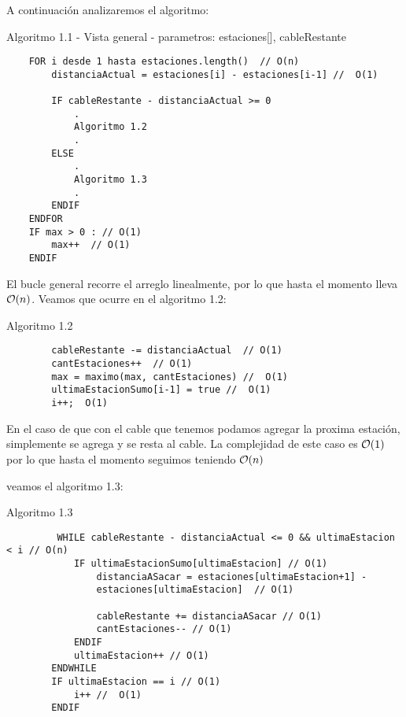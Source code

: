 A continuaci\'on analizaremos el algoritmo:
\begin{description}
    Algoritmo 1.1 - Vista general - parametros: estaciones[], cableRestante
    \begin{verbatim}
    FOR i desde 1 hasta estaciones.length()  // O(n)
        distanciaActual = estaciones[i] - estaciones[i-1] //  O(1)
    
        IF cableRestante - distanciaActual >= 0
            .
            Algoritmo 1.2
            .
        ELSE
            .
            Algoritmo 1.3
            .
        ENDIF
    ENDFOR
    IF max > 0 : // O(1)
        max++  // O(1)
    ENDIF
    \end{verbatim}
\end{description}    
    
El bucle general recorre el arreglo linealmente, por lo que hasta el momento lleva $\mathcal{O}(n)$.
Veamos que ocurre en el algoritmo 1.2:

\begin{description}
    Algoritmo 1.2
    \begin{verbatim}
        cableRestante -= distanciaActual  // O(1)
        cantEstaciones++  // O(1)
        max = maximo(max, cantEstaciones) //  O(1)
        ultimaEstacionSumo[i-1] = true //  O(1)
        i++;  O(1)
    \end{verbatim}
\end{description}

En el caso de que con el cable que tenemos podamos agregar la proxima estaci\'on, simplemente se agrega y se resta al cable.
La complejidad de este caso es $\mathcal{O}(1)$ por lo que hasta el momento seguimos teniendo $\mathcal{O}(n)$

veamos el algoritmo 1.3:
\begin{description}
    Algoritmo 1.3
    \begin{verbatim}
         WHILE cableRestante - distanciaActual <= 0 && ultimaEstacion < i // O(n)
            IF ultimaEstacionSumo[ultimaEstacion] // O(1)
                distanciaASacar = estaciones[ultimaEstacion+1] -
                estaciones[ultimaEstacion]  // O(1)
                
                cableRestante += distanciaASacar // O(1)
                cantEstaciones-- // O(1)
            ENDIF
            ultimaEstacion++ // O(1)
        ENDWHILE
        IF ultimaEstacion == i // O(1)
            i++ //  O(1)
        ENDIF
    \end{verbatim}
\end{description}

